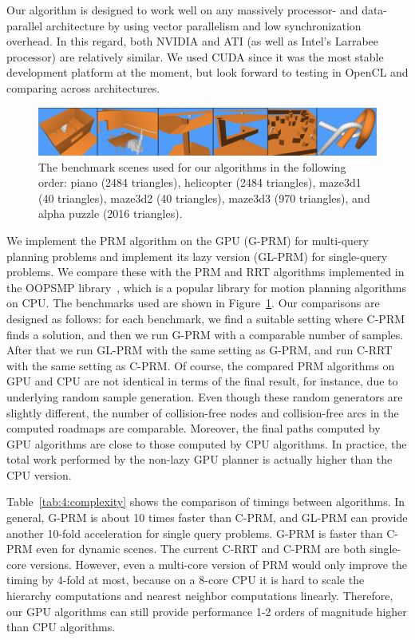 Our algorithm is designed to work well on any massively processor- and data-parallel architecture by using vector parallelism and low synchronization overhead. In this regard, both NVIDIA and ATI (as well as Intel's Larrabee processor) are relatively similar. We used CUDA since it was the most stable development platform at the moment, but look forward to testing in OpenCL and comparing across architectures.

\begin{figure}[htb]
  \centering
  \includegraphics[width=0.9\linewidth]{figs/4/benchmarks.png}
  \caption[Benchmark scenes used for the GPU-based planner]{The benchmark scenes used for our algorithms in the following order: piano (2484 triangles), helicopter (2484 triangles), maze3d1 (40 triangles), maze3d2 (40 triangles), maze3d3 (970 triangles), and alpha puzzle (2016 triangles).}
  \label{fig:4:benchmarks}
\end{figure}

We implement the PRM algorithm on the GPU (G-PRM) for multi-query planning problems and implement its lazy version (GL-PRM) for single-query problems. We compare these with the PRM and RRT algorithms implemented in the OOPSMP library~\cite{plaku+2007:OOPSM}, which is a popular library for motion planning algorithms on CPU. The benchmarks used are shown in Figure~\ref{fig:4:benchmarks}. Our comparisons are designed as follows: for each benchmark, we find a suitable setting where C-PRM finds a solution, and then we run G-PRM with a comparable number of samples. After that we run GL-PRM with the same setting as G-PRM, and run C-RRT with the same setting as C-PRM. Of course, the compared PRM algorithms on GPU and CPU are not identical in terms of the final result, for instance, due to underlying random sample generation. Even though these random generators are slightly different, the number of collision-free nodes and collision-free arcs in the computed roadmaps are comparable. Moreover, the final paths computed by GPU algorithms are close to those computed by CPU algorithms. In practice, the total work performed by the non-lazy GPU planner is actually higher than the CPU version.

Table~\ref{tab:4:complexity} shows the comparison of timings between algorithms. In general, G-PRM is about 10 times faster than C-PRM, and GL-PRM can provide another 10-fold acceleration for single query problems. G-PRM is faster than C-PRM even for dynamic scenes. The current C-RRT and C-PRM are both single-core versions. However, even a multi-core version of PRM would only improve the timing by 4-fold at most, because on a 8-core CPU it is hard to scale the hierarchy computations and nearest neighbor computations linearly. Therefore, our GPU algorithms can still provide performance 1-2 orders of magnitude higher than CPU algorithms.

